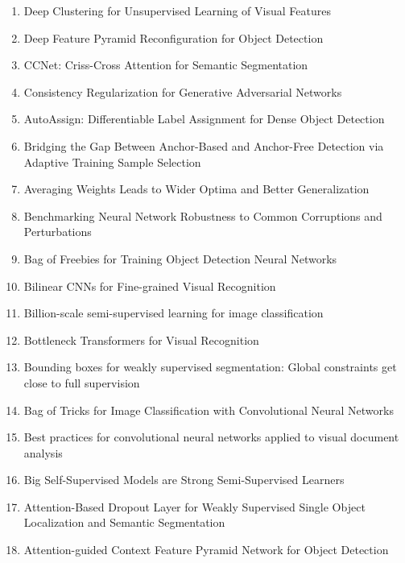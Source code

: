 \documentclass[acmlarge]{acmart}
\begin{document}
\begin{enumerate}
	\item Deep Clustering for Unsupervised Learning of Visual Features \cite{Caron2018DeepCF}
	\item Deep Feature Pyramid Reconfiguration for Object Detection \cite{Kong2018DeepFP}
	\item CCNet: Criss-Cross Attention for Semantic Segmentation \cite{Huang2019CCNetCA}
	\item Consistency Regularization for Generative Adversarial Networks \cite{Zhang2020ConsistencyRF}
	\item AutoAssign: Differentiable Label Assignment for Dense Object Detection \cite{Zhu2020AutoAssignDL}
	\item Bridging the Gap Between Anchor-Based and Anchor-Free Detection via Adaptive Training Sample Selection \cite{Zhang2020BridgingTG}
	\item Averaging Weights Leads to Wider Optima and Better Generalization \cite{Izmailov2018AveragingWL}
	\item Benchmarking Neural Network Robustness to Common Corruptions and Perturbations \cite{Hendrycks2019BenchmarkingNN}
	\item Bag of Freebies for Training Object Detection Neural Networks \cite{Zhang2019BagOF}
	\item Bilinear CNNs for Fine-grained Visual Recognition \cite{Lin2015BilinearCF}
	\item Billion-scale semi-supervised learning for image classification \cite{Yalniz2019BillionscaleSL}
	\item Bottleneck Transformers for Visual Recognition \cite{Srinivas2021BottleneckTF}
	\item Bounding boxes for weakly supervised segmentation: Global constraints get close to full supervision \cite{Kervadec2020BoundingBF}
	\item Bag of Tricks for Image Classification with Convolutional Neural Networks \cite{He2019BagOT}
	\item Best practices for convolutional neural networks applied to visual document analysis \cite{Simard2003BestPF}
	\item Big Self-Supervised Models are Strong Semi-Supervised Learners \cite{Chen2020BigSM}
	\item Attention-Based Dropout Layer for Weakly Supervised Single Object Localization and Semantic Segmentation \cite{Choe2021AttentionBasedDL}
	\item Attention-guided Context Feature Pyramid Network for Object Detection \cite{Cao2020AttentionguidedCF}

\end{enumerate}
\end{document}
